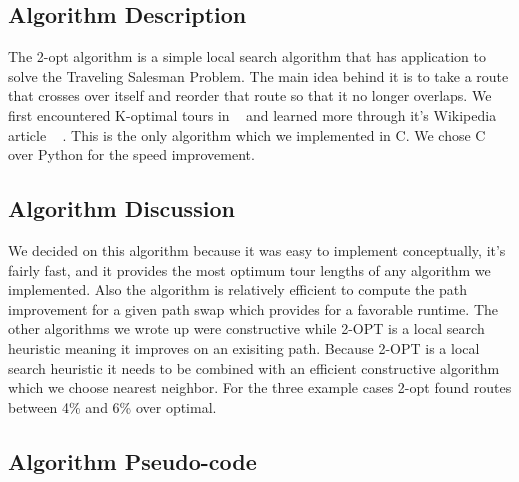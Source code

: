 \documentclass[../report/main.tex]{subfiles}
\begin{document}
\subsection*{Algorithm Description}

The 2-opt algorithm is a simple local search algorithm that has application to solve the Traveling Salesman Problem. The main idea behind it is to take a route that crosses over itself and reorder that route so that it no longer overlaps. We first encountered K-optimal tours in ~\cite{skiena2008} and learned more through it's Wikipedia article ~\cite{wikipedia2opt} .  This is the only algorithm which we implemented in C.  We chose C over Python for the speed improvement.

\subsection*{Algorithm Discussion}

We decided on this algorithm because it was easy to implement conceptually, it's fairly fast, and it provides the most optimum tour lengths of any algorithm we implemented. Also the algorithm is relatively efficient to compute the path improvement for a given path swap which provides for a favorable runtime. The other algorithms we wrote up were constructive while 2-OPT is a local search heuristic meaning it improves on an exisiting path.  Because 2-OPT is a local search heuristic it needs to be combined with an efficient constructive algorithm which we choose nearest neighbor.  For the three example cases 2-opt found routes between 4\% and 6\% over optimal.

\subsection*{Algorithm Pseudo-code}
\end{document}
